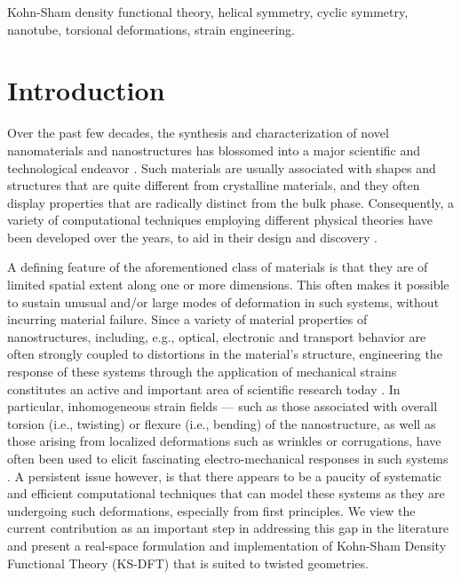 \documentclass[preprint,12pt, 3p, sort&compress]{elsarticle}
\begin{document}
\begin{frontmatter}
\begin{keyword}
Kohn-Sham density functional theory, helical symmetry, cyclic symmetry, nanotube,
torsional deformations, strain engineering. %
\end{keyword}
\end{frontmatter}
\section{Introduction}
\label{sec:introduction}
Over the past few decades, the synthesis and characterization of novel nanomaterials and nanostructures has blossomed into a major scientific and technological endeavor \citep{bhushan2017springer, cao2004nanostructures, nanotech_applications_1, nanotech_gov_website}. Such materials are usually associated with shapes and structures that are quite different from crystalline materials, and they often display properties that are radically distinct from the bulk phase. Consequently, a variety of computational techniques employing different physical theories have been developed over the years, to aid in their design and discovery \citep{Zhigilei2012, musa2011computational, Hutter_abinitio_MD, chelikowsky2019introductory, comp_nano}.

A defining feature of the aforementioned class of materials is that they are of limited spatial extent along one or more dimensions. This often makes it possible to sustain unusual and/or large modes of deformation in such systems, without incurring material failure. Since a variety of material properties of nanostructures, including, e.g., optical, electronic and transport behavior are often strongly coupled to distortions in the material's structure, engineering the response of these systems through the application of mechanical strains constitutes an active and important area of scientific research today \citep{pereira2009strain, ghassemi2012field, fei2014strain, roldan2015strain, schlom2014elastic, li2014elastic}. In particular, inhomogeneous strain fields --- such as those associated with overall torsion (i.e., twisting) or flexure  (i.e., bending) of the nanostructure, as well as those arising from localized deformations such as wrinkles or corrugations, have often been used to elicit fascinating electro-mechanical responses in such systems \citep{hall2006experimental, wei2011strain, falvo1997bending, yang2015tuning}. A persistent issue however, is that there appears to be a paucity of systematic and efficient computational techniques that can model these systems as they are undergoing such deformations, especially from first principles. We view the current contribution as an important step in addressing this gap in the literature and present a real-space formulation and implementation of Kohn-Sham Density Functional Theory (KS-DFT) that is suited to twisted geometries. 
\end{document}
